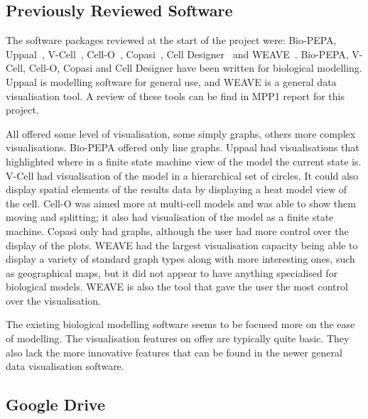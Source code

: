 \subsection{Previously Reviewed Software}

The software packages reviewed at the start of the project were: Bio-PEPA, Uppaal~\cite{uppaal}, V-Cell~\cite{vcell}, Cell-O~\cite{cello}, Copasi~\cite{copasi}, Cell Designer~\cite{celldesigner} and WEAVE~\cite{weave}.  Bio-PEPA, V-Cell, Cell-O, Copasi and Cell Designer have been written for biological modelling.  Uppaal is modelling software for general use, and WEAVE is a general data visualisation tool.  A review of these tools can be find in MPP1 report for this project. 

All offered some level of visualisation, some simply graphs, others more complex visualisations.  Bio-PEPA offered only line graphs.  Uppaal had visualisations that highlighted where in a finite state machine view of the model the current state is.  V-Cell had visualisation of the model in a hierarchical set of circles. It could also display spatial elements of the results data by displaying a heat model view of the cell.  Cell-O was aimed more at multi-cell models and was able to show them moving and splitting; it also had visualisation of the model as a finite state machine.  Copasi only had graphs, although the user had more control over the display of the plots.  WEAVE had the largest visualisation capacity being able to display a variety of standard graph types along with more interesting ones, such as geographical maps, but it did not appear to have anything specialised for biological models.  WEAVE is also the tool that gave the user the most control over the visualisation.

The existing biological modelling software seems to be focused more on the ease of modelling.  The visualisation features on offer are typically quite basic.  They also lack the more innovative features that can be found in the newer general data visualisation software.

\subsection{Google Drive}

